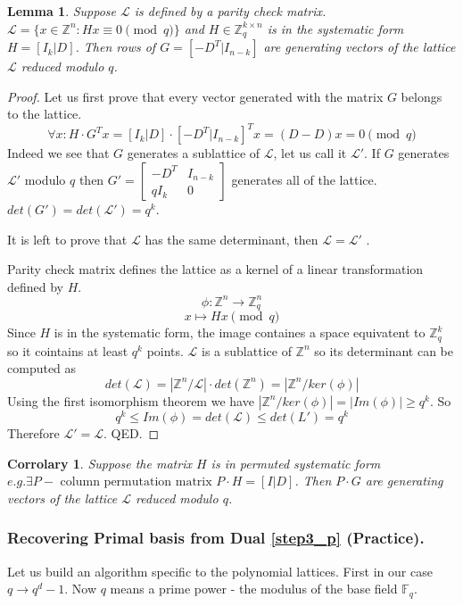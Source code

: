 \documentclass[12pt]{article}
\newcommand{\FF}{\mathbb{F}}
\newcommand{\ZZ}{\mathbb{Z}}
\newcommand{\LL}{\mathcal{L}}
\newtheorem{lemma}{Lemma}
\newtheorem{corrolary}{Corrolary}
\begin{document}
\begin{lemma}\label{coolfact}
    Suppose $\LL$ is defined by a parity check matrix. $\LL = \{x \in \ZZ^{n}: Hx \equiv 0 \pmod{q}\}$ and $H \in \ZZ_{q}^{k \times n}$ is in the systematic form $H = [I_{k}| D]$. Then rows of $G = [-D^{T}| I_{n-k}]$ are generating vectors of the lattice $\LL$ reduced modulo $q$.
\end{lemma}
\begin{proof}
Let us first prove that every vector generated with the matrix $G$ belongs to the lattice.
\[
\forall x: H \cdot G^{T}x = [I_{k}|D] \cdot [-D^{T}| I_{n-k}]^{T}x = (D - D)x = 0 \pmod{q}
\]
Indeed we see that $G$ generates a sublattice of $\LL$, let us call it $\LL'$. If $G$ generates $\LL'$ modulo $q$ then
$
G' = \left[ \begin{array}{c|c} -D^{T} & I_{n-k} \\ \hline qI_k & 0 \end{array}\right]
$
generates all of the lattice. $det(G') = det(\LL') = q^{k}$.

It is left to prove that $\LL$ has the same determinant, then $\LL= \LL'$ .

Parity check matrix defines the lattice as a kernel of a linear transformation defined by $H$.
\[
    \phi: \ZZ^{n} \rightarrow \ZZ_q^{n}
\]
\[
    x \mapsto Hx \pmod{q}
\]
Since $H$ is in the systematic form, the image containes a space equivatent to $\ZZ_{q}^{k}$ so it cointains at least $q^{k}$ points. $\LL$ is a sublattice of $\ZZ^{n}$ so its determinant can be computed as
\[
    det(\LL) = |\ZZ^{n}/\LL| \cdot det(\ZZ^{n}) = |\ZZ^{n}/ker(\phi)|
\]
Using the first isomorphism theorem we have $|\ZZ^{n}/ker(\phi)| = |Im(\phi)| \geq q^{k}$. So
\[
    q^{k} \leq Im(\phi) = det(\LL) \leq det(L') = q^{k}
\]
Therefore $\LL' = \LL$. QED.
\end{proof}

\begin{corrolary}
Suppose the matrix $H$ is in permuted systematic form $e.g. \exists P - \text{ column permutation matrix } P \cdot H = [I | D]$. Then $P \cdot G$ are generating vectors of the lattice $\LL$ reduced modulo $q$.
\end{corrolary}
\subsubsection{Recovering Primal basis from Dual \ref{step3_p} (Practice).}
\label{subsubsec:primal_from_dual_pr_polynomials}

Let us build an algorithm specific to the polynomial lattices. First in our case $q \rightarrow q^{d} -1$. Now $q$ means a prime power - the modulus of the base field $\FF_{q}$.
\end{document}

